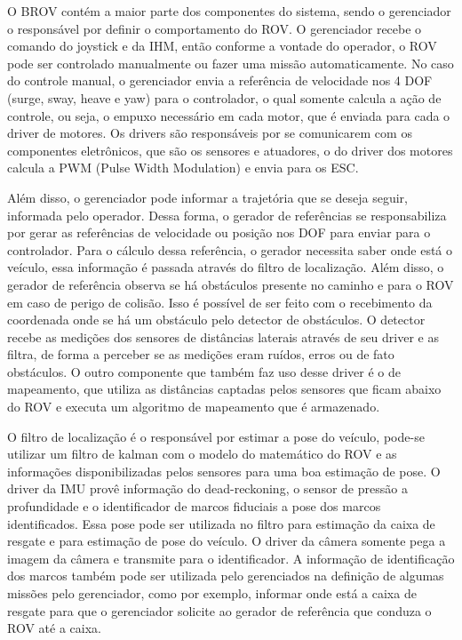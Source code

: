 O BROV contém a maior parte dos componentes do sistema, sendo o gerenciador o responsável por definir o comportamento do ROV. O gerenciador recebe o comando do joystick e da IHM, então conforme a vontade do operador, o ROV pode ser controlado manualmente ou fazer uma missão automaticamente. No caso do controle manual, o gerenciador envia a referência de velocidade nos 4 DOF (surge, sway, heave e yaw) para o controlador, o qual somente calcula a ação de controle, ou seja, o empuxo necessário em cada motor, que é enviada para cada o driver de motores. Os drivers são responsáveis por se comunicarem com os componentes eletrônicos, que são os sensores e atuadores, o do driver dos motores calcula a PWM (Pulse Width Modulation) e envia para os ESC.

Além disso, o gerenciador pode informar a trajetória que se deseja seguir, informada pelo operador. Dessa forma, o gerador de referências se responsabiliza por gerar as referências de velocidade ou posição nos DOF para enviar para o controlador. Para o cálculo dessa referência, o gerador necessita saber onde está o veículo, essa informação é passada através do filtro de localização. Além disso, o gerador de referência observa se há obstáculos presente no caminho e para o ROV em caso de perigo de colisão. Isso é possível de ser feito com o recebimento da coordenada onde se há um obstáculo pelo detector de obstáculos. O detector recebe as medições dos sensores de distâncias laterais através de seu driver e as filtra, de forma a perceber se as medições eram ruídos, erros ou de fato obstáculos. O outro componente que também faz uso desse driver é o de mapeamento, que utiliza as distâncias captadas pelos sensores que ficam abaixo do ROV e executa um algoritmo de mapeamento que é armazenado.

O filtro de localização é o responsável por estimar a pose do veículo, pode-se utilizar um filtro de kalman com o modelo do matemático do ROV e as informações disponibilizadas pelos sensores para uma boa estimação de pose. O driver da IMU provê informação do dead-reckoning, o sensor de pressão a profundidade e o identificador de marcos fiduciais a pose dos marcos identificados. Essa pose pode ser utilizada no filtro para estimação da caixa de resgate e para estimação de pose do veículo. O driver da câmera somente pega a imagem da câmera e transmite para o identificador. A informação de identificação dos marcos também pode ser utilizada pelo gerenciados na definição de algumas missões pelo gerenciador, como por exemplo, informar onde está a caixa de resgate para que o gerenciador solicite ao gerador de referência que conduza o ROV até a caixa.
